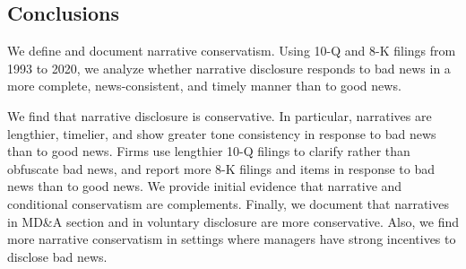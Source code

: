 \documentclass[letterpaper,12pt]{article}
\begin{document}
\begin{spacing}{1.5}
\section{Conclusions}

\noindent We define and document narrative conservatism. Using 10-Q and 8-K filings from 1993 to 2020, we analyze whether narrative disclosure responds to bad news in a more complete, news-consistent, and timely manner than to good news. 

We find that narrative disclosure is conservative. In particular, narratives are lengthier, timelier, and show greater tone consistency in response to bad news than to good news. Firms use lengthier 10-Q filings to clarify rather than obfuscate bad news, and report more 8-K filings and items in response to bad news than to good news. We provide initial evidence that narrative and conditional conservatism are complements. Finally, we document that narratives in MD\&A section and in voluntary disclosure are more conservative. Also, we find more narrative conservatism in settings where managers have strong incentives to disclose bad news.


\end{spacing}

\newpage



\newpage


\newpage


\newpage


\newpage
\setcounter{page}{1}

\end{document}
